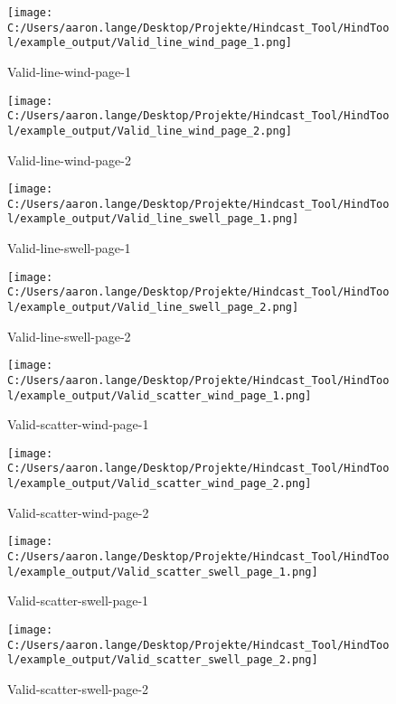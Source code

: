 \begin{figure}[H] 
 \centering 
 \texttt{[image: C:/Users/aaron.lange/Desktop/Projekte/Hindcast\_Tool/HindTool/example\_output/Valid\_line\_wind\_page\_1.png]} 
 \caption{ Valid-line-wind-page-1 } 
 \label{fig: Valid_line_wind_page_1 } 
\end{figure}
\begin{figure}[H] 
 \centering 
 \texttt{[image: C:/Users/aaron.lange/Desktop/Projekte/Hindcast\_Tool/HindTool/example\_output/Valid\_line\_wind\_page\_2.png]} 
 \caption{ Valid-line-wind-page-2 } 
 \label{fig: Valid_line_wind_page_2 } 
\end{figure}
\begin{figure}[H] 
 \centering 
 \texttt{[image: C:/Users/aaron.lange/Desktop/Projekte/Hindcast\_Tool/HindTool/example\_output/Valid\_line\_swell\_page\_1.png]} 
 \caption{ Valid-line-swell-page-1 } 
 \label{fig: Valid_line_swell_page_1 } 
\end{figure}
\begin{figure}[H] 
 \centering 
 \texttt{[image: C:/Users/aaron.lange/Desktop/Projekte/Hindcast\_Tool/HindTool/example\_output/Valid\_line\_swell\_page\_2.png]} 
 \caption{ Valid-line-swell-page-2 } 
 \label{fig: Valid_line_swell_page_2 } 
\end{figure}
\begin{figure}[H] 
 \centering 
 \texttt{[image: C:/Users/aaron.lange/Desktop/Projekte/Hindcast\_Tool/HindTool/example\_output/Valid\_scatter\_wind\_page\_1.png]} 
 \caption{ Valid-scatter-wind-page-1 } 
 \label{fig: Valid_scatter_wind_page_1 } 
\end{figure}
\begin{figure}[H] 
 \centering 
 \texttt{[image: C:/Users/aaron.lange/Desktop/Projekte/Hindcast\_Tool/HindTool/example\_output/Valid\_scatter\_wind\_page\_2.png]} 
 \caption{ Valid-scatter-wind-page-2 } 
 \label{fig: Valid_scatter_wind_page_2 } 
\end{figure}
\begin{figure}[H] 
 \centering 
 \texttt{[image: C:/Users/aaron.lange/Desktop/Projekte/Hindcast\_Tool/HindTool/example\_output/Valid\_scatter\_swell\_page\_1.png]} 
 \caption{ Valid-scatter-swell-page-1 } 
 \label{fig: Valid_scatter_swell_page_1 } 
\end{figure}
\begin{figure}[H] 
 \centering 
 \texttt{[image: C:/Users/aaron.lange/Desktop/Projekte/Hindcast\_Tool/HindTool/example\_output/Valid\_scatter\_swell\_page\_2.png]} 
 \caption{ Valid-scatter-swell-page-2 } 
 \label{fig: Valid_scatter_swell_page_2 } 
\end{figure}